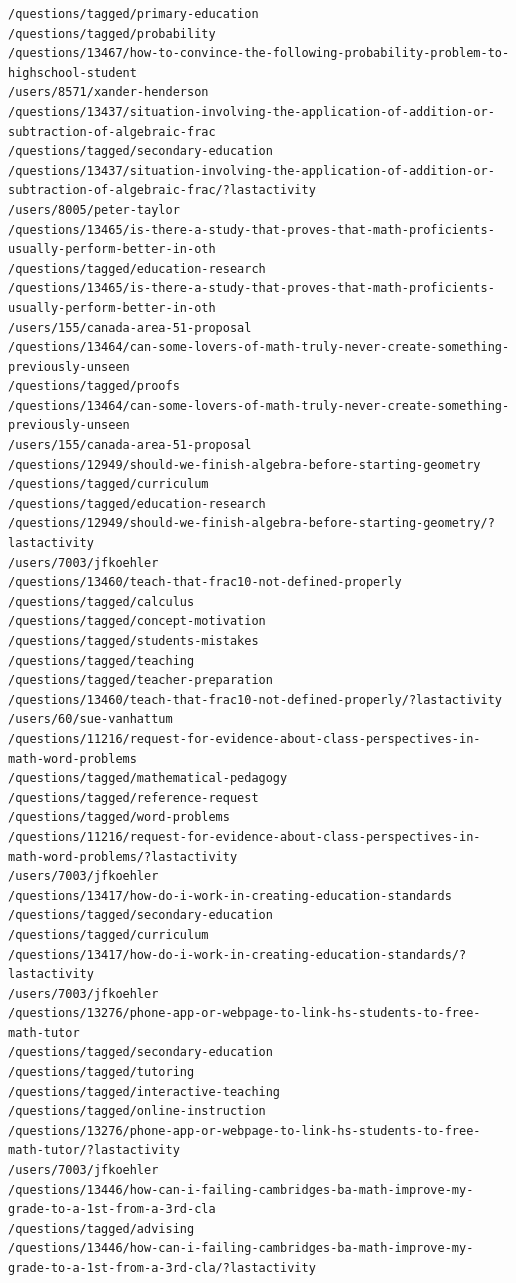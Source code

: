 \documentclass[11pt]{article}
\begin{document}
\begin{Verbatim}[commandchars=\\\{\}]
/questions/tagged/primary-education
/questions/tagged/probability
/questions/13467/how-to-convince-the-following-probability-problem-to-highschool-student
/users/8571/xander-henderson
/questions/13437/situation-involving-the-application-of-addition-or-subtraction-of-algebraic-frac
/questions/tagged/secondary-education
/questions/13437/situation-involving-the-application-of-addition-or-subtraction-of-algebraic-frac/?lastactivity
/users/8005/peter-taylor
/questions/13465/is-there-a-study-that-proves-that-math-proficients-usually-perform-better-in-oth
/questions/tagged/education-research
/questions/13465/is-there-a-study-that-proves-that-math-proficients-usually-perform-better-in-oth
/users/155/canada-area-51-proposal
/questions/13464/can-some-lovers-of-math-truly-never-create-something-previously-unseen
/questions/tagged/proofs
/questions/13464/can-some-lovers-of-math-truly-never-create-something-previously-unseen
/users/155/canada-area-51-proposal
/questions/12949/should-we-finish-algebra-before-starting-geometry
/questions/tagged/curriculum
/questions/tagged/education-research
/questions/12949/should-we-finish-algebra-before-starting-geometry/?lastactivity
/users/7003/jfkoehler
/questions/13460/teach-that-frac10-not-defined-properly
/questions/tagged/calculus
/questions/tagged/concept-motivation
/questions/tagged/students-mistakes
/questions/tagged/teaching
/questions/tagged/teacher-preparation
/questions/13460/teach-that-frac10-not-defined-properly/?lastactivity
/users/60/sue-vanhattum
/questions/11216/request-for-evidence-about-class-perspectives-in-math-word-problems
/questions/tagged/mathematical-pedagogy
/questions/tagged/reference-request
/questions/tagged/word-problems
/questions/11216/request-for-evidence-about-class-perspectives-in-math-word-problems/?lastactivity
/users/7003/jfkoehler
/questions/13417/how-do-i-work-in-creating-education-standards
/questions/tagged/secondary-education
/questions/tagged/curriculum
/questions/13417/how-do-i-work-in-creating-education-standards/?lastactivity
/users/7003/jfkoehler
/questions/13276/phone-app-or-webpage-to-link-hs-students-to-free-math-tutor
/questions/tagged/secondary-education
/questions/tagged/tutoring
/questions/tagged/interactive-teaching
/questions/tagged/online-instruction
/questions/13276/phone-app-or-webpage-to-link-hs-students-to-free-math-tutor/?lastactivity
/users/7003/jfkoehler
/questions/13446/how-can-i-failing-cambridges-ba-math-improve-my-grade-to-a-1st-from-a-3rd-cla
/questions/tagged/advising
/questions/13446/how-can-i-failing-cambridges-ba-math-improve-my-grade-to-a-1st-from-a-3rd-cla/?lastactivity

\end{Verbatim}
\end{document}
